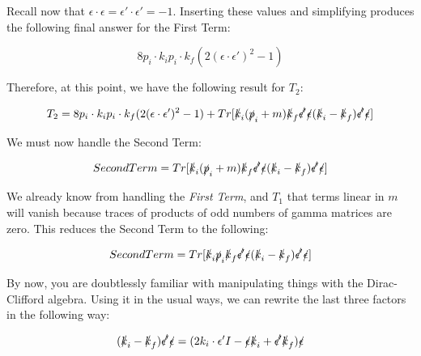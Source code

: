 \documentclass[a4]{article}
\begin{document}
    Recall now that $\epsilon \cdot \epsilon = \epsilon' \cdot \epsilon' = -1$. Inserting these values and simplifying produces the following final answer for the First Term:

    \begin{framed}
        \begin{equation}
            8 p_i \cdot k_i p_i \cdot k_f (2 (\epsilon \cdot \epsilon')^2 - 1)
        \end{equation}
    \end{framed}

    Therefore, at this point, we have the following result for $T_2$:

    \begin{equation}
        T_2 = 8 p_i \cdot k_i p_i \cdot k_f (2 (\epsilon \cdot \epsilon')^2 - 1) + Tr [\slashed{k}_i (\slashed{p}_i + m) \slashed{k}_f \slashed{\epsilon'} \slashed{\epsilon} (\slashed{k}_i - \slashed{k}_f) \slashed{\epsilon'} \slashed{\epsilon}]
    \end{equation}

    We must now handle the Second Term:

    \begin{equation}
        Second Term = Tr [\slashed{k}_i (\slashed{p}_i + m) \slashed{k}_f \slashed{\epsilon'} \slashed{\epsilon} (\slashed{k}_i - \slashed{k}_f) \slashed{\epsilon'} \slashed{\epsilon}]
    \end{equation}

    We already know from handling the \emph{First Term}, and $T_1$ that terms linear in $m$ will vanish because traces of products of odd numbers of gamma matrices are zero.
    This reduces the Second Term to the following:

    \begin{equation}
        Second Term = Tr [\slashed{k}_i \slashed{p}_i \slashed{k}_f \slashed{\epsilon'} \slashed{\epsilon} (\slashed{k}_i - \slashed{k}_f) \slashed{\epsilon'} \slashed{\epsilon}]
    \end{equation}

    By now, you are doubtlessly familiar with manipulating things with the Dirac-Clifford algebra. Using it in the usual ways, we can rewrite the last three factors in the
    following way:

    \begin{equation}
        (\slashed{k}_i - \slashed{k}_f) \slashed{\epsilon'} \slashed{\epsilon} = (2 k_i \cdot \epsilon' I - \slashed{\epsilon} \slashed{k}_i + \slashed{\epsilon'} \slashed{k}_f) \slashed{\epsilon}
    \end{equation}
\end{document}
